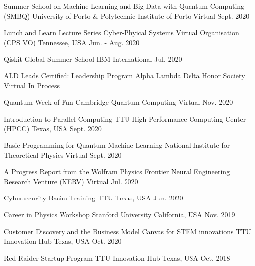 

\begin{cvhonors}

    \cvhonor
    {Summer School on Machine Learning and Big Data with Quantum Computing (SMBQ)}
    {University of Porto \& Polytechnic Institute of Porto}
    {Virtual}
    {Sept. 2020}

    \cvhonor
    {Lunch and Learn Lecture Series}
    {Cyber-Phyical Systems Virtual Organisation (CPS VO) }
    {Tennessee, USA}
    {Jun. - Aug. 2020}

    \cvhonor
    {Qiskit Global Summer School}
    {IBM}
    {International}
    {Jul. 2020}

\end{cvhonors}


\begin{cvhonors}

    \cvhonor
    {ALD Leads Certified: Leadership Program}
    {Alpha Lambda Delta Honor Society}
    {Virtual}
    {In Process}

    \cvhonor
    {Quantum Week of Fun}
    {Cambridge Quantum Computing}
    {Virtual}
    {Nov. 2020}

    \cvhonor
    {Introduction to Parallel Computing}
    {TTU High Performance Computing Center (HPCC)}
    {Texas, USA}
    {Sept. 2020}


    \cvhonor
    {Basic Programming for Quantum Machine Learning}
    {National Institute for Theoretical Physics}
    {Virtual}
    {Sept. 2020}

    \cvhonor
    {A Progress Report from the Wolfram Physics Frontier}
    {Neural Engineering Research Venture (NERV)}
    {}
    {Virtual}
    {Jul. 2020}

    \cvhonor
    {Cybersecurity Basics Training}
    {TTU}
    {Texas, USA}
    {Jun. 2020}

    \cvhonor
    {Career in Physics Workshop}
    {Stanford University}
    {California, USA}
    {Nov. 2019}

    \cvhonor
    {Customer Discovery and the Business Model Canvas for STEM innovations}
    {TTU Innovation Hub}
    {Texas, USA}
    {Oct. 2020}

    \cvhonor
    {Red Raider Startup Program}
    {TTU Innovation Hub}
    {Texas, USA}
    {Oct. 2018}

\end{cvhonors}




